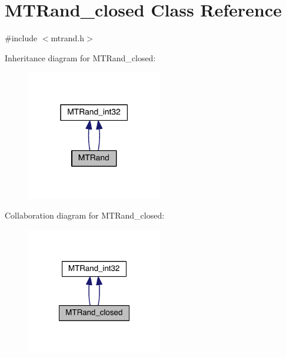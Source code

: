 \hypertarget{a00018}{\section{M\-T\-Rand\-\_\-closed Class Reference}
\label{a00018}
}


{\ttfamily \#include $<$mtrand.\-h$>$}



Inheritance diagram for M\-T\-Rand\-\_\-closed\-:
\nopagebreak
\begin{figure}[H]
\begin{center}
\leavevmode
\includegraphics[width=168pt]{a00216}
\end{center}
\end{figure}


Collaboration diagram for M\-T\-Rand\-\_\-closed\-:
\nopagebreak
\begin{figure}[H]
\begin{center}
\leavevmode
\includegraphics[width=168pt]{a00217}
\end{center}
\end{figure}
